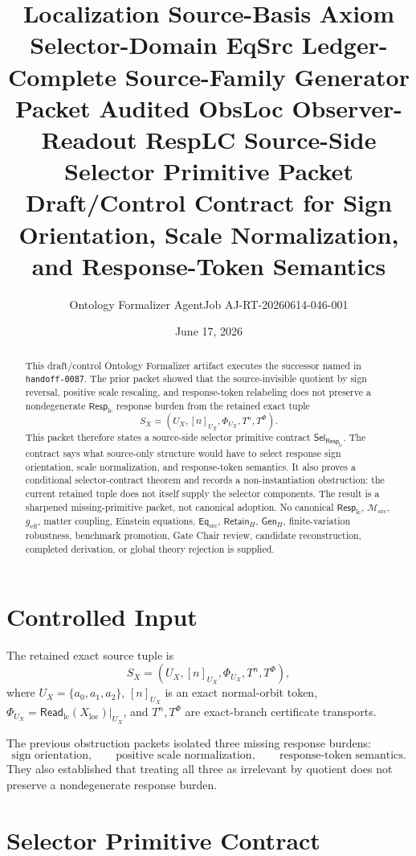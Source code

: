 \documentclass[11pt]{article}
\title{\textbf{Localization Source-Basis Axiom Selector-Domain EqSrc Ledger-Complete Source-Family Generator Packet Audited ObsLoc Observer-Readout RespLC Source-Side Selector Primitive Packet}\\[0.35em]
\large Draft/Control Contract for Sign Orientation, Scale Normalization, and Response-Token Semantics}
\author{Ontology Formalizer AgentJob AJ-RT-20260614-046-001}
\date{June 17, 2026}
\newcommand{\EqSrc}{\mathsf{Eq}_{\mathrm{src}}}
\newcommand{\ReadLC}{\mathsf{Read}_{\mathrm{lc}}}
\newcommand{\RetainH}{\mathsf{Retain}_{H}}
\newcommand{\GenH}{\mathsf{Gen}_{H}}
\newcommand{\Msrc}{\mathcal{M}_{\mathrm{src}}}
\newcommand{\RespLC}{\mathsf{Resp}_{\mathrm{lc}}}
\newcommand{\SelResp}{\mathsf{Sel}_{\RespLC}}
\newcommand{\geff}{g_{\mathrm{eff}}}
\begin{document}
\maketitle

\begin{abstract}
This draft/control Ontology Formalizer artifact executes the successor
named in \texttt{handoff-0087}. The prior packet showed that the
source-invisible quotient by sign reversal, positive scale rescaling,
and response-token relabeling does not preserve a nondegenerate
\(\RespLC\) response burden from the retained exact tuple
\[
    S_X=(U_X,[n]_{U_X},\Phi_{U_X},T^n,T^\Phi).
\]
This packet therefore states a source-side selector primitive contract
\(\SelResp\). The contract says what source-only structure would have
to select response sign orientation, scale normalization, and
response-token semantics. It also proves a conditional
selector-contract theorem and records a non-instantiation obstruction:
the current retained tuple does not itself supply the selector
components. The result is a sharpened missing-primitive packet, not
canonical adoption. No canonical \(\RespLC\), \(\Msrc\), \(\geff\),
matter coupling, Einstein equations, \(\EqSrc\), \(\RetainH\),
\(\GenH\), finite-variation robustness, benchmark promotion, Gate
Chair review, candidate reconstruction, completed derivation, or
global theory rejection is supplied.
\end{abstract}

\section{Controlled Input}

The retained exact source tuple is
\[
    S_X=(U_X,[n]_{U_X},\Phi_{U_X},T^n,T^\Phi),
\]
where \(U_X=\{a_0,a_1,a_2\}\), \([n]_{U_X}\) is an exact
normal-orbit token, \(\Phi_{U_X}=\ReadLC(X_{\mathrm{loc}})|_{U_X}\),
and \(T^n,T^\Phi\) are exact-branch certificate transports.

The previous obstruction packets isolated three missing response
burdens:
\[
    \text{sign orientation},\qquad
    \text{positive scale normalization},\qquad
    \text{response-token semantics}.
\]
They also established that treating all three as irrelevant by quotient
does not preserve a nondegenerate response burden.

\section{Selector Primitive Contract}
\end{document}
